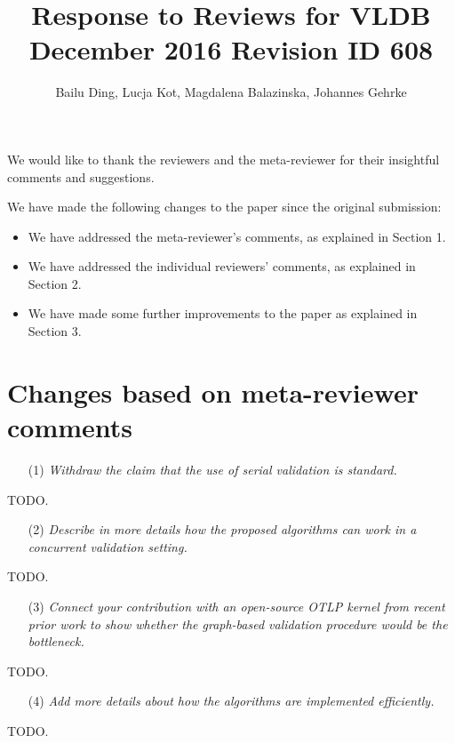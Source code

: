 \documentclass{article}
\begin{document}
\title{Response to Reviews for VLDB December 2016 Revision ID 608}
\author{Bailu Ding, Lucja Kot, Magdalena Balazinska, Johannes Gehrke}
\maketitle

We would like to thank the reviewers and the meta-reviewer for their insightful comments and suggestions. 

\bigskip

We have made the following changes to the paper since the original submission:
\begin{itemize}
\item We have addressed the meta-reviewer's comments, as explained in Section 1.
\item We have addressed the individual reviewers' comments, as explained in Section 2.
\item We have made some further improvements to the paper as explained in Section 3.
\end{itemize}

\section{Changes based on meta-reviewer comments}

\begin{itemize}
\item[(1)] \emph{Withdraw the claim that the use of serial validation is standard. }
\end{itemize}
TODO.

\begin{itemize}
\item[(2)] \emph{Describe in more details how the proposed algorithms can work in a concurrent validation setting. }
\end{itemize}
TODO.

\begin{itemize}
\item[(3)]  \emph{Connect your contribution with an open-source OTLP kernel from recent prior work to show whether the graph-based validation procedure would be the bottleneck.}
\end{itemize}
TODO.

\begin{itemize}
\item[(4)]  \emph{Add more details about how the algorithms are implemented efficiently.}
\end{itemize}
TODO.
\end{document}
